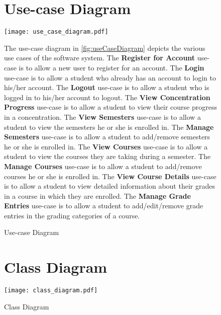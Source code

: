 \documentclass[12pt]{article}
\begin{document}


\begin{figure}[p!]
  \section{Use-case Diagram}
  \centering
  \texttt{[image: use\_case\_diagram.pdf]}
  \caption{Use-case Diagram}
  \label{fig:useCaseDiagram}
  \newcommand{\usecaseall}{use-case is to allow }
  \begin{justify}
    The use-case diagram in \autoref{fig:useCaseDiagram} depicts the various use cases of the
    software system. The \textbf{Register for Account} \usecaseall a new user to register for an
    account. The \textbf{Login} \usecaseall a student who already has an account to login to his/her
    account. The \textbf{Logout} \usecaseall a student who is logged in to his/her account to
    logout. The \textbf{View Concentration Progress} \usecaseall a student to view their course
    progress in a concentration. The \textbf{View Semesters} \usecaseall a student to view the
    semesters he or she is enrolled in. The \textbf{Manage Semesters} \usecaseall a student to
    add/remove semesters he or she is enrolled in. The \textbf{View Courses} \usecaseall a student
    to view the courses they are taking during a semester. The \textbf{Manage Courses} \usecaseall a
    student to add/remove courses he or she is enrolled in. The \textbf{View Course Details}
    \usecaseall a student to view detailed information about their grades in a course in which they
    are enrolled. The \textbf{Manage Grade Entries} \usecaseall a student to add/edit/remove grade
    entries in the grading categories of a course.
  \end{justify}
\end{figure}

\clearpage

\begin{figure}[p!]
  \section{Class Diagram}
  \centering
  \texttt{[image: class\_diagram.pdf]}
  \caption{Class Diagram}
  \label{fig:classDiagram}
\end{figure}
\end{document}
